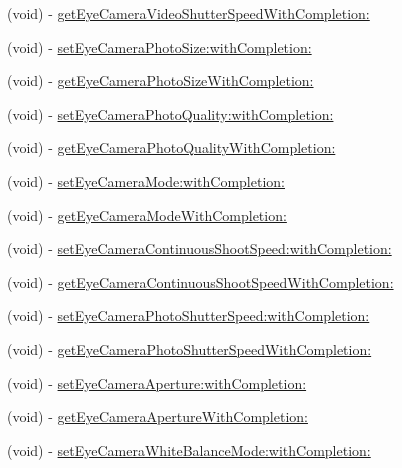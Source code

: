 \begin{DoxyCompactItemize}
\item 
(void) -\/ \hyperlink{interface_p_v_eye_camera_affbbc33f237c3eb26b14f6a4d60d956d}{get\+Eye\+Camera\+Video\+Shutter\+Speed\+With\+Completion\+:}
\item 
(void) -\/ \hyperlink{interface_p_v_eye_camera_ae3d0344ef42065b309f9031bdd50b24a}{set\+Eye\+Camera\+Photo\+Size\+:with\+Completion\+:}
\item 
(void) -\/ \hyperlink{interface_p_v_eye_camera_a24dd28a21b97e49172b37f20e17b44b2}{get\+Eye\+Camera\+Photo\+Size\+With\+Completion\+:}
\item 
(void) -\/ \hyperlink{interface_p_v_eye_camera_a7e108d05b80c70a0f54c5cc8dd093c76}{set\+Eye\+Camera\+Photo\+Quality\+:with\+Completion\+:}
\item 
(void) -\/ \hyperlink{interface_p_v_eye_camera_adbd5e1425817bc53fd822bf662b33784}{get\+Eye\+Camera\+Photo\+Quality\+With\+Completion\+:}
\item 
(void) -\/ \hyperlink{interface_p_v_eye_camera_a9cd6118458266a821aef37f89ac7ea79}{set\+Eye\+Camera\+Mode\+:with\+Completion\+:}
\item 
(void) -\/ \hyperlink{interface_p_v_eye_camera_afa4bd832264fe04894eb5e77de01491d}{get\+Eye\+Camera\+Mode\+With\+Completion\+:}
\item 
(void) -\/ \hyperlink{interface_p_v_eye_camera_a5203392ff0bedf8bd288ea5063c9521d}{set\+Eye\+Camera\+Continuous\+Shoot\+Speed\+:with\+Completion\+:}
\item 
(void) -\/ \hyperlink{interface_p_v_eye_camera_ac7088cda01ca454c462eb3a7f459b482}{get\+Eye\+Camera\+Continuous\+Shoot\+Speed\+With\+Completion\+:}
\item 
(void) -\/ \hyperlink{interface_p_v_eye_camera_adca1950dd337adc4d7fb64f2faf66c94}{set\+Eye\+Camera\+Photo\+Shutter\+Speed\+:with\+Completion\+:}
\item 
(void) -\/ \hyperlink{interface_p_v_eye_camera_aee38ad2e7d3c2c19f784d41e9aa4b378}{get\+Eye\+Camera\+Photo\+Shutter\+Speed\+With\+Completion\+:}
\item 
(void) -\/ \hyperlink{interface_p_v_eye_camera_a4a1e42302806409ad3076302efd92fcc}{set\+Eye\+Camera\+Aperture\+:with\+Completion\+:}
\item 
(void) -\/ \hyperlink{interface_p_v_eye_camera_a8a72bfeb30537d12a6c39e15977dfceb}{get\+Eye\+Camera\+Aperture\+With\+Completion\+:}
\item 
(void) -\/ \hyperlink{interface_p_v_eye_camera_addd86fd48375b640bc0e29908018a12e}{set\+Eye\+Camera\+White\+Balance\+Mode\+:with\+Completion\+:}
\item 

\end{DoxyCompactItemize}
